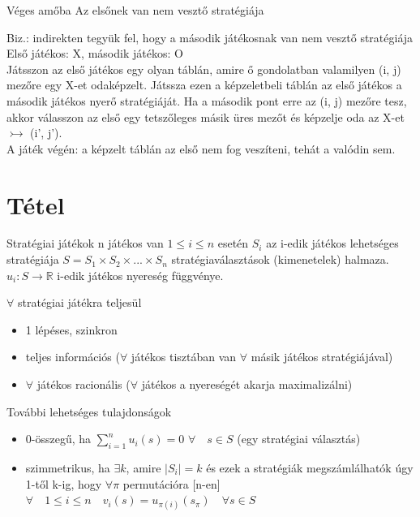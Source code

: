 \begin{theorem}{Véges amőba}{}
	Az elsőnek van nem vesztő stratégiája
\end{theorem}
Biz.: indirekten tegyük fel, hogy a második játékosnak van nem vesztő stratégiája \\
Első játékos: X, második játékos: O\\
Játsszon az első játékos egy olyan táblán, amire ő gondolatban valamilyen (i, j) mezőre egy X-et odaképzelt. Játssza ezen a képzeletbeli táblán az első játékos a második játékos nyerő stratégiáját. Ha a második pont erre az (i, j) mezőre tesz, akkor válasszon az első egy tetszőleges másik üres mezőt és képzelje oda az X-et $\rightarrowtail$ (i', j'). \\
A játék végén: a képzelt táblán az első nem fog veszíteni, tehát a valódin sem.

\newpage
\section{Tétel}
\begin{definition}{Stratégiai játékok}{}
	n játékos van $1\leq i \leq n$ esetén $S_i$ az i-edik játékos lehetséges stratégiája $S = S_1 \times S_2 \times ...  \times S_n$ stratégiaválasztások (kimenetelek) halmaza.\\
	$u_i : S \longrightarrow \mathbb{R}$ i-edik játékos nyereség függvénye.
\end{definition}

$\forall$ stratégiai játékra teljesül
\begin{itemize}
	\item 1 lépéses, szinkron
	\item teljes információs ($\forall$ játékos tisztában van  $\forall$ másik játékos stratégiájával)
	\item $\forall$ játékos racionális ($\forall$ játékos a nyereségét akarja maximalizálni)
\end{itemize}

További lehetséges tulajdonságok
\begin{itemize}
	\item 0-összegű, ha $\sum_{i=1}^{n}{}u_i(s) = 0$  $\forall \quad s \in S$ (egy stratégiai választás)
	\item szimmetrikus, ha $\exists k$, amire $|S_i|= k$ és ezek a stratégiák megszámlálhatók úgy 1-től k-ig, hogy $\forall \pi$ permutációra [n-en] $\forall \quad 1\leq i \leq n \quad v_i(s)=u_{\pi (i)}(s_{\pi}) \quad \forall s \in S$
\end{itemize}

